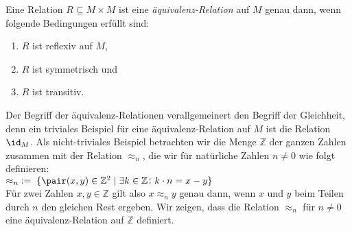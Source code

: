 \begin{Definition}
Eine Relation $R \subseteq M \times M$  ist eine 
\emph{\"{a}quivalenz-Relation} auf $M$ genau dann, wenn folgende Bedingungen erf\"{u}llt sind:
\begin{enumerate}
\item $R$ ist reflexiv auf $M$,
\item $R$ ist symmetrisch und
\item $R$ ist transitiv.
\end{enumerate}
\end{Definition}

Der Begriff der \"{a}quivalenz-Relationen verallgemeinert den Begriff der Gleichheit, denn
ein triviales Beispiel f\"{u}r eine \"{a}quivalenz-Relation auf $M$ ist die Relation $\id_M$.
Als nicht-triviales Beispiel betrachten wir die Menge $\mathbb{Z}$ der ganzen Zahlen
zusammen mit der Relation $\approx_n$, die wir f\"{u}r nat\"{u}rliche Zahlen $n \not= 0$ wie folgt definieren: \\[0.2cm]
\hspace*{1.3cm}
 $\approx_n \;:=\; \{ \pair(x,y) \in \mathbb{Z}^2 \mid \exists k \in \mathbb{Z} \colon k \cdot n = x - y \}$
\\[0.2cm]
F\"{u}r zwei Zahlen $x,y \in \mathbb{Z}$ gilt also  $x \approx_n y$ genau dann, wenn $x$ und
$y$ beim Teilen durch $n$ den gleichen Rest ergeben.   Wir zeigen, dass die
Relation $\approx_n$ f\"{u}r $n \not=0$ eine \"{a}quivalenz-Relation auf $\mathbb{Z}$ definiert.
